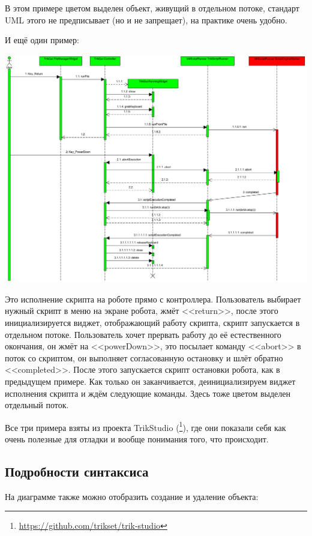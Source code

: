 \documentclass[a5paper]{article}
\begin{document}
В этом примере цветом выделен объект, живущий в отдельном потоке, стандарт UML этого не предписывает (но и не запрещает), на практике очень удобно.

И ещё один пример:

\begin{center}
	\includegraphics[width=\textwidth]{sequenceDiagramExample3.png}
\end{center}

Это исполнение скрипта на роботе прямо с контроллера. Пользователь выбирает нужный скрипт в меню на экране робота, жмёт <<return>>, после этого инициализируется виджет, отображающий работу скрипта, скрипт запускается в отдельном потоке. Пользователь хочет прервать работу до её естественного окончания, он жмёт на <<powerDown>>, это посылает команду <<abort>> в поток со скриптом, он выполняет согласованную остановку и шлёт обратно <<completed>>. После этого запускается скрипт остановки робота, как в предыдущем примере. Как только он заканчивается, деинициализируем виджет исполнения скрипта и ждём следующие команды. Здесь тоже цветом выделен отдельный поток.

Все три примера взяты из проекта TrikStudio (\footnote{\url{https://github.com/trikset/trik-studio}}), где они показали себя как очень полезные для отладки и вообще понимания того, что происходит.

\subsection{Подробности синтаксиса}

На диаграмме также можно отобразить создание и удаление объекта:
\end{document}
